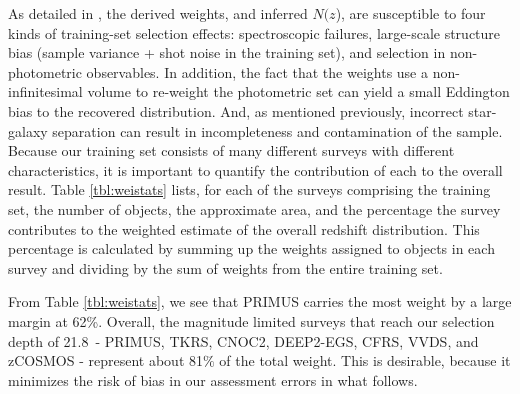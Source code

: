 \documentclass[preprint]{aastex}
\newcommand{\rmax}{21.8}
\newcommand{\Nofz}{$N(z$)}
\begin{document}
As detailed in \cite{CunhaPhotoz09}, the derived weights, and inferred \Nofz,
are susceptible to four kinds of training-set selection effects: spectroscopic
failures, large-scale structure bias (sample variance + shot noise in the
training set), and selection in non-photometric observables.  In addition, the
fact that the weights use a non-infinitesimal volume to re-weight the
photometric set can yield a small Eddington bias to the recovered distribution.
And, as mentioned previously, incorrect star-galaxy separation can result in
incompleteness and contamination of the sample.  Because our training set
consists of many different surveys with different characteristics, it is
important to quantify the contribution of each to the overall result.  Table
\ref{tbl:weistats} lists, for each of the surveys comprising the training set,
the number of objects, the approximate area, and the percentage the survey
contributes to the weighted estimate of the overall redshift distribution.
This percentage is calculated by summing up the weights assigned to objects in
each survey and dividing by the sum of weights from the entire training set.


From Table \ref{tbl:weistats}, we see that PRIMUS carries the most weight by a
large margin at 62\%.  Overall, the magnitude limited surveys that reach our
selection depth of \rmax\ - PRIMUS, TKRS, CNOC2, DEEP2-EGS, CFRS, VVDS, and
zCOSMOS - represent about 81$\%$ of the total weight.  This is desirable,
because it minimizes the risk of bias in our assessment errors in what follows.
\end{document}
